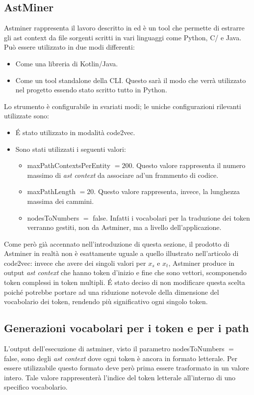 \subsection{AstMiner}
Astminer rappresenta il lavoro descritto in \cite{kovalenko2019pathminer} ed è un tool che permette di estrarre gli ast context da file sorgenti scritti in vari linguaggi come Python, C/\CPP{} e Java.
Può essere utilizzato in due modi differenti:
  \begin{itemize}
    \item Come una libreria di Kotlin/Java.
    \item Come un tool standalone della CLI. Questo sarà il modo che verrà utilizzato nel progetto essendo stato scritto tutto in Python.
  \end{itemize}
Lo strumento è configurabile in svariati modi; le uniche configurazioni rilevanti utilizzate sono:
  \begin{itemize}
    \item \'E stato utilizzato in modalità code2vec.
    \item Sono stati utilizzati i seguenti valori:
      \begin{itemize}
        \item maxPathContextsPerEntity $=200$. Questo valore rappresenta il numero massimo di \textit{ast context} da associare ad'un frammento di codice.
        \item maxPathLength $=20$. Questo valore rappresenta, invece, la lunghezza massima dei cammini.
        \item nodesToNumbers $=$ false. Infatti i vocabolari per la traduzione dei token verranno gestiti, non da Astminer, ma a livello dell'applicazione.
      \end{itemize}
  \end{itemize}
Come però già accennato nell'introduzione di questa sezione, il prodotto di Astminer in realtà non è esattamente uguale a quello illustrato nell'articolo di code2vec: invece che avere dei singoli valori per $x_s$ e $x_t$, Astminer produce in output \textit{ast context} che hanno token d'inizio e fine che sono vettori, scomponendo token complessi in token multipli.
\'E stato deciso di non modificare questa scelta poiché potrebbe portare ad una riduzione notevole della dimensione del vocabolario dei token, rendendo più significativo ogni singolo token.


\subsection{Generazioni vocabolari per i token e per i path}\label{subsec:vocab}
L'output dell'esecuzione di astminer, visto il parametro nodesToNumbers $=$ false, sono degli \textit{ast context} dove ogni token è ancora in formato letterale.
Per essere utilizzabile questo formato deve però prima essere trasformato in un valore intero.
Tale valore rappresenterà l'indice del token letterale all'interno di uno specifico vocabolario.

